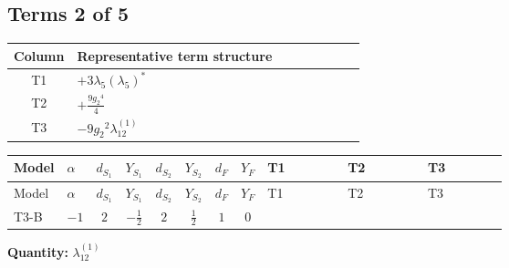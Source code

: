 \documentclass[8pt]{article}
\begin{document}
\begin{landscape}
\subsection*{Terms 2 of 5}
\begin{center}
\begin{tabular}{@{}c >{\raggedright\arraybackslash}p{0.82\linewidth}@{}}
\toprule
Column & Representative term structure \\
\midrule
T1 & \(\displaystyle +3 {\lambda_5} \left({\lambda_5}\right)^{*}\) \\
\midrule
T2 & \(\displaystyle +\frac{9 {g_2}^4}{4}\) \\
\midrule
T3 & \(\displaystyle -9 {g_2}^2 {\lambda_{12}^{(1)}}\) \\
\midrule
\bottomrule
\end{tabular}
\end{center}
\smallskip
\tiny
\begin{longtable}{@{}llcccccc >{\raggedright\arraybackslash}p{0.21\linewidth} >{\raggedright\arraybackslash}p{0.21\linewidth} >{\raggedright\arraybackslash}p{0.21\linewidth}@{}}
\toprule
Model & $\alpha$ & $d_{S_1}$ & $Y_{S_1}$ & $d_{S_2}$ & $Y_{S_2}$ & $d_F$ & $Y_F$ & T1 & T2 & T3 \\
\midrule
\endfirsthead
\toprule
Model & $\alpha$ & $d_{S_1}$ & $Y_{S_1}$ & $d_{S_2}$ & $Y_{S_2}$ & $d_F$ & $Y_F$ & T1 & T2 & T3 \\
\midrule
\endhead
T3-B & $-1$ & $2$ & $-\frac{1}{2}$ & $2$ & $\frac{1}{2}$ & $1$ & $0$ & \scriptsize\adjustbox{max width=\linewidth}{$\begin{gathered} +3 {\lambda_5} \left({\lambda_5}\right)^{*}\end{gathered}$} & \scriptsize\adjustbox{max width=\linewidth}{$\begin{gathered} +\frac{9 {g_2}^4}{4}\end{gathered}$} & \scriptsize\adjustbox{max width=\linewidth}{$\begin{gathered} -9 {g_2}^2 {\lambda_{12}^{(1)}}\end{gathered}$} \\
\midrule
\bottomrule
\end{longtable}
\clearpage
\noindent\textbf{Quantity: }$\lambda_{12}^{(1)}$\par\smallskip

\end{landscape}
\end{document}
